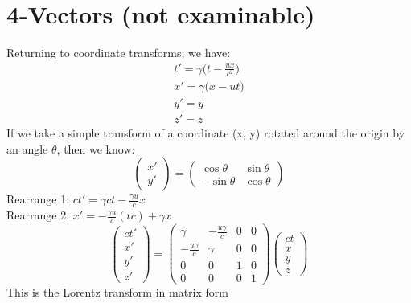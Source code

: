 \documentclass[a4paper, 11pt, fleqn, normalem]{report}
\begin{document}
\section{4-Vectors (not examinable)}
Returning to coordinate transforms, we have:
\begin{gather*}
    t' = \gamma\Big(t - \frac{ux}{c^{2}}\Big) \\
    x' = \gamma\Big(x - ut) \\
    y' = y \\
    z' = z
\end{gather*}
If we take a simple transform of a coordinate (x, y) rotated around the origin by an angle $\theta$, then we know:
\begin{equation*}
    \begin{pmatrix}
        x' \\
        y'
    \end{pmatrix}
    =
    \begin{pmatrix}
        \cos{\theta}  & \sin{\theta} \\
        -\sin{\theta} & \cos{\theta}
    \end{pmatrix}
\end{equation*}
Rearrange 1: $ct' = \gamma ct - \frac{\gamma u}{c}x$ \\
Rearrange 2: $x' = -\frac{\gamma u}{c}(tc) + \gamma x$
\begin{equation*}
    \begin{pmatrix}
        ct' \\
        x'  \\
        y'  \\
        z'
    \end{pmatrix}
    =
    \begin{pmatrix}
        \gamma             & -\frac{u\gamma}{c} & 0 & 0 \\
        -\frac{u\gamma}{c} & \gamma             & 0 & 0 \\
        0                  & 0                  & 1 & 0 \\
        0                  & 0                  & 0 & 1
    \end{pmatrix}
    \begin{pmatrix}
        ct \\
        x  \\
        y  \\
        z
    \end{pmatrix}
\end{equation*}
This is the Lorentz transform in matrix form \\
\end{document}
